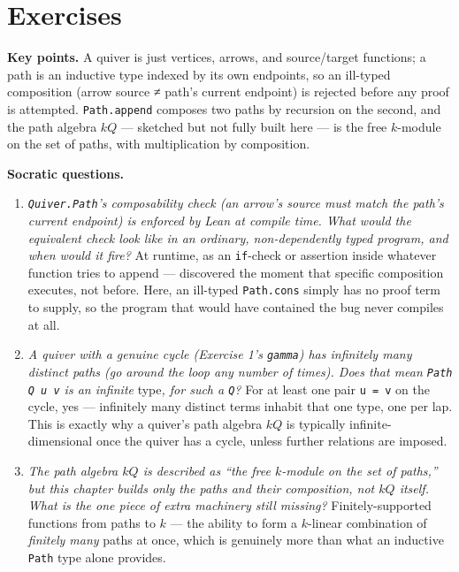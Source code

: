 \section{Exercises}\label{sec:11-path-algebras:06-exercises:1}

\textbf{Key points.} A quiver is just vertices, arrows, and source/target functions; a path is an inductive type indexed by its own endpoints, so an ill-typed composition (arrow source ≠ path's current endpoint) is rejected before any proof is attempted. \texttt{Path.append} composes two paths by recursion on the second, and the path algebra \(kQ\) --- sketched but not fully built here --- is the free \(k\)-module on the set of paths, with multiplication by composition.

\textbf{Socratic questions.}

\begin{enumerate}
\def\labelenumi{\arabic{enumi}.}
\item
  \emph{\texttt{Quiver.Path}'s composability check (an arrow's source must match the path's current endpoint) is enforced by Lean at compile time. What would the equivalent check look like in an ordinary, non-dependently typed program, and when would it fire?} At runtime, as an \texttt{if}-check or assertion inside whatever function tries to append --- discovered the moment that specific composition executes, not before. Here, an ill-typed \texttt{Path.cons} simply has no proof term to supply, so the program that would have contained the bug never compiles at all.
\item
  \emph{A quiver with a genuine cycle (Exercise 1's \texttt{gamma}) has infinitely many distinct paths (go around the loop any number of times). Does that mean \texttt{Path Q u v} is an infinite }type\emph{, for such a \texttt{Q}?} For at least one pair \texttt{u = v} on the cycle, yes --- infinitely many distinct terms inhabit that one type, one per lap. This is exactly why a quiver's path algebra \(kQ\) is typically infinite-dimensional once the quiver has a cycle, unless further relations are imposed.
\item
  \emph{The path algebra \(kQ\) is described as ``the free \(k\)-module on the set of paths,'' but this chapter builds only the paths and their composition, not \(kQ\) itself. What is the one piece of extra machinery still missing?} Finitely-supported functions from paths to \(k\) --- the ability to form a \(k\)-linear combination of \emph{finitely many} paths at once, which is genuinely more than what an inductive \texttt{Path} type alone provides.

\end{enumerate}

